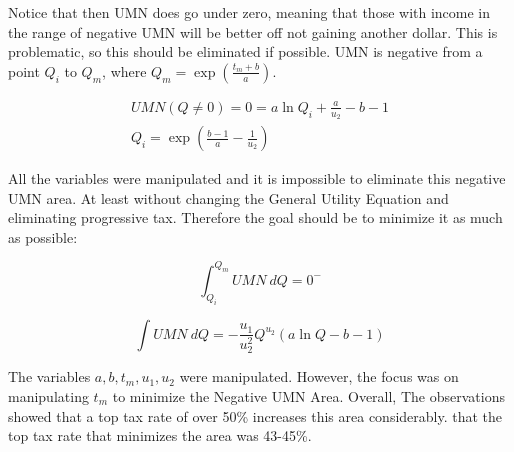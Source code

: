 \documentclass[12pt,letterpaper]{article}
\begin{document}
			Notice that then UMN does go under zero, meaning that those with income in the range of negative UMN will be better off not gaining another dollar. This is problematic, so this should be eliminated if possible. UMN is negative from a point $Q_i$ to $Q_m$, where $Q_m = \exp(\frac{t_m+b}{a})$.

			\begin{align*}
				UMN(Q \neq 0) = 0 = a \ln Q_i + \frac{a}{u_2} -b -1 \\
				Q_i = \exp \left(\frac{b-1}{a}- \frac{1}{u_2}\right)
			\end{align*}




			All the variables were manipulated and it is impossible to eliminate this negative UMN area. At least without changing the General Utility Equation and eliminating progressive tax. Therefore the goal should be to minimize it as much as possible:

			\begin{equation}
				\int^{Q_m}_{Q_i} UMN \ dQ = 0^-
			\end{equation}

			\begin{equation}
				\int UMN \ dQ = - \frac{u_1}{u_2^2} Q^{u_2} (a \ln Q -b-1)
			\end{equation}

			The variables $a, b, t_m, u_1, u_2 $ were manipulated. However, the focus was on manipulating $t_m$ to minimize the Negative UMN Area. Overall, The observations showed that a top tax rate of over 50\% increases this area considerably. that the top tax rate that minimizes the area was 43-45\%.
		
	
	
\end{document}
